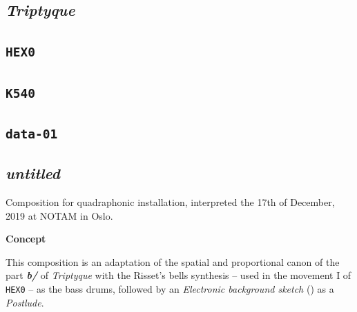 \documentclass{book}
\begin{document}
\begin{mdframed}[style=stylesec]
\section{\textit{Triptyque}}
\label{tript}
\smallskip
\end{mdframed}


\newpage

\begin{mdframed}[style=stylesec]
\section{\texttt{HEX0}}
\label{hex0}
\smallskip
\end{mdframed}


\bigskip

\begin{mdframed}[style=stylesec]
\section{\texttt{K540}}
\label{k540}
\smallskip
\end{mdframed}


\bigskip
\bigskip

\begin{mdframed}[style=stylesec]
\section{\texttt{data-01}}
\label{d01}
\smallskip
\end{mdframed}


\bigskip
\bigskip

\begin{mdframed}[style=stylesec]
\section{\textit{untitled}}
\label{scp}
\smallskip
\end{mdframed}

\bigskip

Composition for quadraphonic installation, interpreted the 17th of December, 2019 at NOTAM in Oslo.

\bigskip

\noindent \textbf{{\large Concept}}
\hrulefill

\bigskip

This composition is an adaptation of the spatial and proportional canon of  the part \textbf{\textit{b/}}
of \textsl{Triptyque} with the Risset's bells synthesis -- used in the movement I of \texttt{HEX0} -- as the bass drums, followed by an \textsl{Electronic background sketch} () as a \textit{Postlude}.
\end{document}
